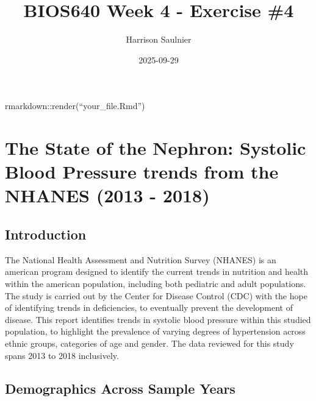 \documentclass[
]{article}
\title{BIOS640 Week 4 - Exercise \#4}
\author{Harrison Saulnier}
\date{2025-09-29}
\begin{document}
\maketitle

rmarkdown::render(``your\_file.Rmd'')

\section{The State of the Nephron: Systolic Blood Pressure trends from
the NHANES (2013 -
2018)}\label{the-state-of-the-nephron-systolic-blood-pressure-trends-from-the-nhanes-2013---2018}

\subsection{Introduction}\label{introduction}

The National Health Assessment and Nutrition Survey (NHANES) is an
american program designed to identify the current trends in nutrition
and health within the american population, including both pediatric and
adult populations. The study is carried out by the Center for Disease
Control (CDC) with the hope of identifying trends in deficiencies, to
eventually prevent the development of disease. This report identifies
trends in systolic blood pressure within this studied population, to
highlight the prevalence of varying degrees of hypertension across
ethnic groups, categories of age and gender. The data reviewed for this
study spans 2013 to 2018 inclusively.

\subsection{Demographics Across Sample
Years}\label{demographics-across-sample-years}
\end{document}
